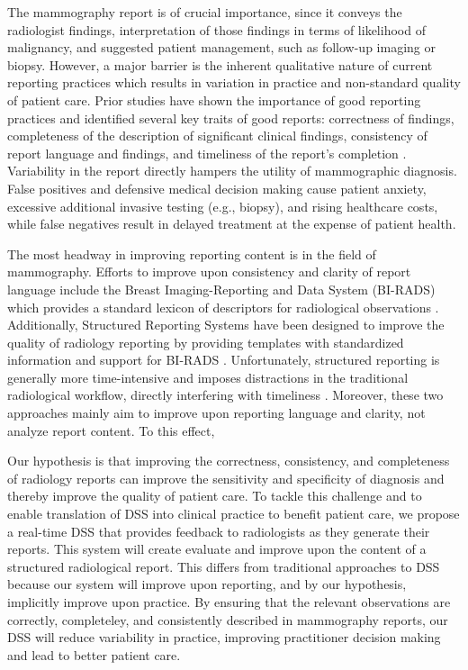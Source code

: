 The mammography report is of crucial importance, since it conveys the radiologist findings, interpretation of those findings in terms of likelihood of malignancy, and suggested patient management, such as follow-up imaging or biopsy. However, a major barrier is the inherent qualitative nature of current reporting practices which results in variation in practice and non-standard quality of patient care. Prior studies have shown the importance of good reporting practices and identified several key traits of good reports: correctness of findings, completeness of the description of significant clinical findings, consistency of report language and findings, and timeliness of the report's completion \cite{Johnson:2004kh, HaraldO:2004hi}. Variability in the report directly hampers the utility of mammographic diagnosis. False positives and defensive medical decision making cause patient anxiety, excessive additional invasive testing (e.g., biopsy), and rising healthcare costs, while false negatives result in delayed treatment at the expense of patient health.

The most headway in improving reporting content is in the field of mammography. Efforts to improve upon consistency and clarity of report language include the Breast Imaging-Reporting and Data System (BI-RADS) which provides a standard lexicon of descriptors for radiological observations \cite{Liberman:ws}. Additionally, Structured Reporting Systems have been designed to improve the quality of radiology reporting by providing templates with standardized information and support for BI-RADS \cite{Reiner:2009ib}. Unfortunately, structured reporting is generally more time-intensive and imposes distractions in the traditional radiological workflow, directly interfering with timeliness \cite{Weiss:2008er}. Moreover, these two approaches mainly aim to improve upon reporting language and clarity, not analyze report content. To this effect, 

Our hypothesis is that improving the correctness, consistency, and completeness of radiology reports can improve the sensitivity and specificity of diagnosis and thereby improve the quality of patient care. To tackle this challenge and to enable translation of DSS into clinical practice to benefit patient care, we propose a real-time DSS that provides feedback to radiologists as they generate their reports. This system will create evaluate and improve upon the content of a structured radiological report. This differs from traditional approaches to DSS because our system will improve upon reporting, and by our hypothesis, implicitly improve upon practice. By ensuring that the relevant observations are correctly, completeley, and consistently described in mammography reports, our DSS will reduce variability in practice, improving practitioner decision making and lead to better patient care.

